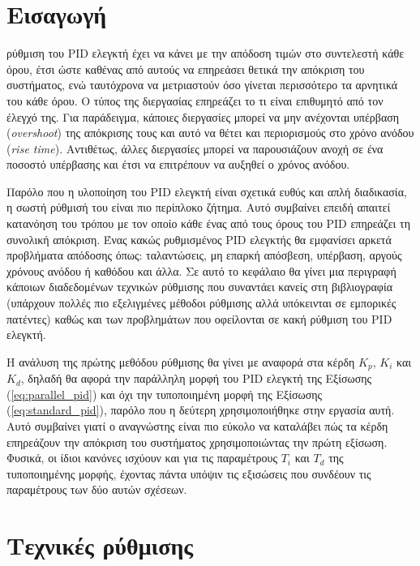 


\section{Εισαγωγή}

\lettrine[findent=2pt]{}{} ρύθμιση του PID ελεγκτή έχει να κάνει με την απόδοση τιμών στο συντελεστή κάθε όρου, έτσι ώστε καθένας από αυτούς να επηρεάσει θετικά την απόκριση του συστήματος, ενώ ταυτόχρονα να μετριαστούν όσο γίνεται περισσότερο τα αρνητικά του κάθε όρου. Ο τύπος της διεργασίας επηρεάζει το τι είναι επιθυμητό από τον έλεγχό της. Για παράδειγμα, κάποιες διεργασίες μπορεί να μην ανέχονται υπέρβαση (\emph{overshoot}) της απόκρισης τους και αυτό να θέτει και περιορισμούς στο χρόνο ανόδου (\emph{rise time}). Αντιθέτως, άλλες διεργασίες μπορεί να παρουσιάζουν ανοχή σε ένα ποσοστό υπέρβασης και έτσι να επιτρέπουν να αυξηθεί ο χρόνος ανόδου.

Παρόλο που η υλοποίηση του PID ελεγκτή είναι σχετικά ευθύς και απλή διαδικασία, η σωστή ρύθμισή του είναι πιο περίπλοκο ζήτημα. Αυτό συμβαίνει επειδή απαιτεί κατανόηση του τρόπου με τον οποίο κάθε ένας από τους όρους του PID επηρεάζει τη συνολική απόκριση. Ένας κακώς ρυθμισμένος PID ελεγκτής θα εμφανίσει αρκετά προβλήματα απόδοσης όπως: ταλαντώσεις, μη επαρκή απόσβεση, υπέρβαση, αργούς χρόνους ανόδου ή καθόδου και άλλα. Σε αυτό το κεφάλαιο θα γίνει μια περιγραφή κάποιων διαδεδομένων τεχνικών ρύθμισης που συναντάει κανείς στη βιβλιογραφία (υπάρχουν πολλές πιο εξελιγμένες μέθοδοι ρύθμισης αλλά υπόκεινται σε εμπορικές πατέντες) καθώς και των προβλημάτων που οφείλονται σε κακή ρύθμιση του PID ελεγκτή.

Η ανάλυση της πρώτης μεθόδου ρύθμισης θα γίνει με αναφορά στα κέρδη $K_p$, $K_i$ και $K_d$, δηλαδή θα αφορά την παράλληλη μορφή του PID ελεγκτή της Εξίσωσης (\ref{eq:parallel_pid}) και όχι την τυποποιημένη μορφή της Εξίσωσης (\ref{eq:standard_pid}), παρόλο που η δεύτερη χρησιμοποιήθηκε στην εργασία αυτή. Αυτό συμβαίνει γιατί ο αναγνώστης είναι πιο εύκολο να καταλάβει πώς τα κέρδη επηρεάζουν την απόκριση του συστήματος χρησιμοποιώντας την πρώτη εξίσωση. Φυσικά, οι ίδιοι κανόνες ισχύουν και για τις παραμέτρους $T_i$ και $T_d$ της τυποποιημένης μορφής, έχοντας πάντα υπόψιν τις εξισώσεις που συνδέουν τις παραμέτρους των δύο αυτών σχέσεων.

\section{Τεχνικές ρύθμισης}

